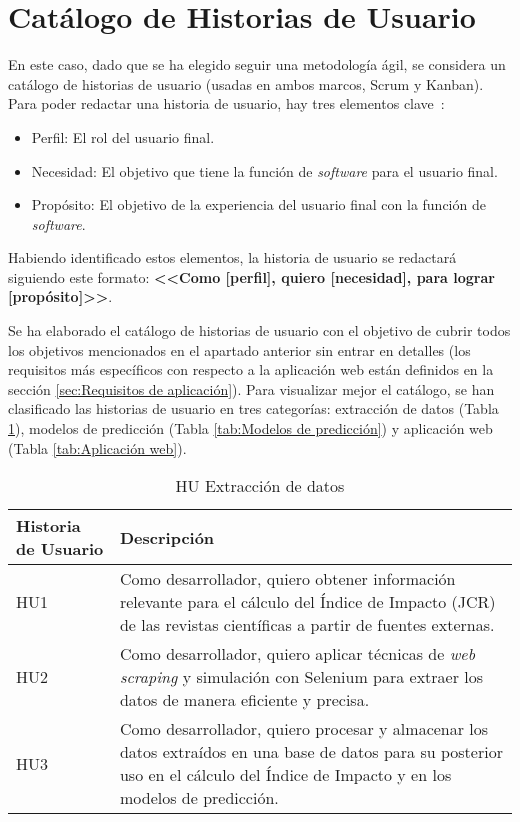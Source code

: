 \section{Catálogo de Historias de Usuario}
\label{sec:Catálogo de requisitos}

En este caso, dado que se ha elegido seguir una metodología ágil, se considera un catálogo de historias de usuario (usadas en ambos marcos, Scrum y Kanban). Para poder redactar una historia de usuario, hay tres elementos clave~\cite{Asana_2022}:
\begin{itemize}
    \item Perfil: El rol del usuario final.
    \item Necesidad: El objetivo que tiene la función de \textit{software} para el usuario final.
    \item Propósito: El objetivo de la experiencia del usuario final con la función de \textit{software}.
\end{itemize}

Habiendo identificado estos elementos, la historia de usuario se redactará siguiendo este formato: \textbf{<<Como [perfil], quiero [necesidad], para lograr [propósito]>>}.

Se ha elaborado el catálogo de historias de usuario con el objetivo de cubrir todos los objetivos mencionados en el apartado anterior sin entrar en detalles (los requisitos más específicos con respecto a la aplicación web están definidos en la sección \ref{sec:Requisitos de aplicación}). Para visualizar mejor el catálogo, se han clasificado las historias de usuario en tres categorías: extracción de datos (Tabla \ref{tab:extracción_de_datos}), modelos de predicción  (Tabla \ref{tab:Modelos de predicción}) y aplicación web (Tabla \ref{tab:Aplicación web}).

\begin{table}[h]
\centering
\begin{tabular}{|p{3cm}|p{8cm}|}
\hline
\textbf{Historia de Usuario} & \textbf{Descripción} \\
\hline
HU1 & Como desarrollador, quiero obtener información relevante para el cálculo del Índice de Impacto (JCR) de las revistas científicas a partir de fuentes externas. \\
\hline
HU2 & Como desarrollador, quiero aplicar técnicas de \textit{web scraping} y simulación con Selenium para extraer los datos de manera eficiente y precisa. \\
\hline
HU3 & Como desarrollador, quiero procesar y almacenar los datos extraídos en una base de datos para su posterior uso en el cálculo del Índice de Impacto y en los modelos de predicción. \\
\hline
\end{tabular}
\caption{HU Extracción de datos}
\label{tab:extracción_de_datos}
\end{table}
\newpage

